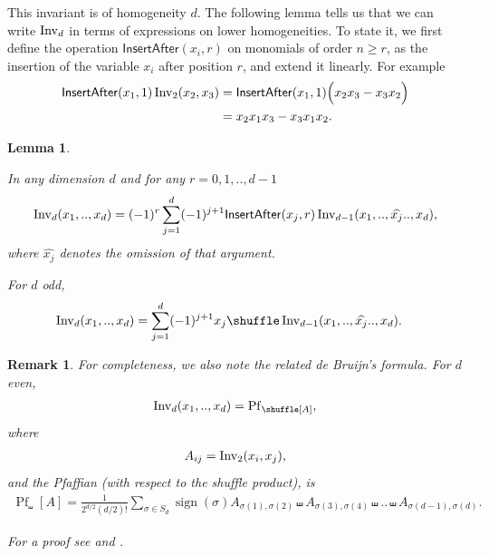 \documentclass{scrartcl}
\theoremstyle{plain}
\newtheorem{lemma}[theorem]{Lemma}
\newtheorem{remark}[theorem]{Remark}
\theoremstyle{definition}
\newcommand{\1}[1]{1_{\{#1\}}}
\newcommand{\ds}{d} %
\newcommand{\sign}{\operatorname{sign}}
\begin{document}
This invariant is of homogeneity $\ds$.
The following lemma tells us that %
we can write
$\firstInvariant{\ds}$ in terms of expressions on lower homogeneities.
%
\newcommand{\insertAfter}{\mathsf{InsertAfter}}
To state it, we first define the operation $\insertAfter(x_i,r)$ %
on monomials %
of order $n \ge r$, 
as the insertion of the variable $x_i$ after position $r$, and extend it linearly.
For example
\begin{align*}
  \insertAfter(x_1,1) \firstInvariant{2}(x_2,x_3)
  &=
  \insertAfter(x_1,1) \Big( x_2 x_3 - x_3 x_2 \Big) \\
  &=
  x_2 x_1 x_3 - x_3 x_1 x_2.
\end{align*}


\begin{lemma}
  \label{lem:dxw1}

  In any dimension $\ds$
  and for any $r=0,1,..,\ds-1$
  \begin{align*}
    \firstInvariant{\ds}(x_1,..,x_\ds)
    =
    (-1)^{r}
    \sum_{j=1}^{\ds}
    (-1)^{j+1} \insertAfter(x_j,r) \firstInvariant{\ds-1}( x_1, .., \widehat{x_j} .., x_\ds ),
  \end{align*}
  where $\widehat{x_j}$ denotes the omission of that argument.

  For $\ds$ odd,
  \begin{align*}
    \firstInvariant{\ds}(x_1,..,x_\ds)
    &=
    \sum_{j=1}^\ds
    (-1)^{j+1}
    x_j \shuffle \firstInvariant{\ds-1}( x_1, .., \widehat{x_j} .., x_\ds ).
  \end{align*}
\end{lemma}
\begin{remark}
  For completeness, we also note the related \emph{de Bruijn's formula}.
  For $\ds$ even,
  \begin{align*}
    \firstInvariant{\ds}(x_1,..,x_\ds)
    =
    \operatorname{Pf}_\shuffle[ A ],
  \end{align*}
  where
  \begin{align*}
    A_{ij}
    = 
    \operatorname{Inv}_{2}(x_i,x_j),
  \end{align*}
  and the Pfaffian (with respect to the shuffle product), is
  \begin{align*}
    \operatorname{Pf}_\shuffle[ A ]
    =
    \frac{1}{2^{\ds/2} (\ds/2)!}
    \sum_{\sigma \in S_{\ds}} \sign(\sigma)
    A_{\sigma(1),\sigma(2)}
    \shuffle
    A_{\sigma(3),\sigma(4)}
    \shuffle
    ..
    \shuffle
    A_{\sigma(\ds-1),\sigma(\ds)}.
  \end{align*}

  For a proof see \cite{bib:DB1955}
  and \cite{bib:LT2002}.
\end{remark}
\end{document}
